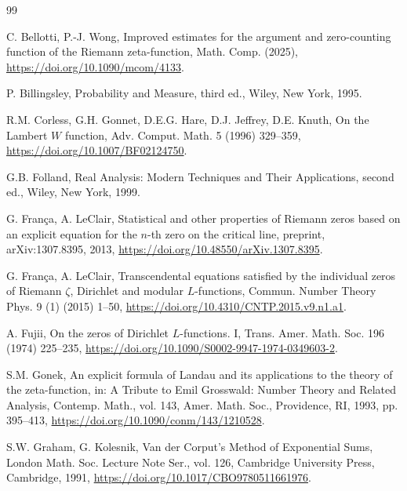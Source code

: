 \documentclass[preprint,12pt]{elsarticle}
\numberwithin{equation}{section}
\theoremstyle{plain}
\theoremstyle{definition}
\theoremstyle{remark}
\begin{document}
\begin{thebibliography}{99}

C. Bellotti, P.-J. Wong, Improved estimates for the argument and zero-counting function of the Riemann zeta-function, Math. Comp. (2025), \href{https://doi.org/10.1090/mcom/4133}{https://doi.org/10.1090/mcom/4133}.

P. Billingsley, Probability and Measure, third ed., Wiley, New York, 1995.

R.M. Corless, G.H. Gonnet, D.E.G. Hare, D.J. Jeffrey, D.E. Knuth, On the Lambert $W$ function, Adv. Comput. Math. 5 (1996) 329--359, \href{https://doi.org/10.1007/BF02124750}{https://doi.org/10.1007/BF02124750}.

G.B. Folland, Real Analysis: Modern Techniques and Their Applications, second ed., Wiley, New York, 1999.

G. Fran\c{c}a, A. LeClair, Statistical and other properties of Riemann zeros based on an explicit equation for the $n$-th zero on the critical line, preprint, arXiv:1307.8395, 2013, \href{https://doi.org/10.48550/arXiv.1307.8395}{https://doi.org/10.48550/arXiv.1307.8395}.

G. Fran\c{c}a, A. LeClair, Transcendental equations satisfied by the individual zeros of Riemann $\zeta$, Dirichlet and modular $L$-functions, Commun. Number Theory Phys. 9 (1) (2015) 1--50, \href{https://doi.org/10.4310/CNTP.2015.v9.n1.a1}{https://doi.org/10.4310/CNTP.2015.v9.n1.a1}.

A. Fujii, On the zeros of Dirichlet $L$-functions. I, Trans. Amer. Math. Soc. 196 (1974) 225--235, \href{https://doi.org/10.1090/S0002-9947-1974-0349603-2}{https://doi.org/10.1090/S0002-9947-1974-0349603-2}.

S.M. Gonek, An explicit formula of Landau and its applications to the theory of the zeta-function, in: A Tribute to Emil Grosswald: Number Theory and Related Analysis, Contemp. Math., vol. 143, Amer. Math. Soc., Providence, RI, 1993, pp. 395--413, \href{https://doi.org/10.1090/conm/143/1210528}{https://doi.org/10.1090/conm/143/1210528}.

S.W. Graham, G. Kolesnik, Van der Corput's Method of Exponential Sums, London Math. Soc. Lecture Note Ser., vol. 126, Cambridge University Press, Cambridge, 1991, \href{https://doi.org/10.1017/CBO9780511661976}{https://doi.org/10.1017/CBO9780511661976}.


\end{thebibliography}
\end{document}
